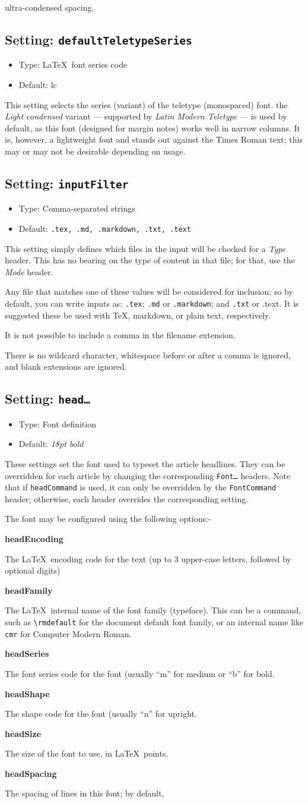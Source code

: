 \documentclass[a4paper,DIV=11]{scrartcl}
\newcommand{\deft}[2]{\nopagebreak\noindent\hspace{0.5in}\textbf{#1}\par\noindent{}#2\pagebreak[1]\par}
\newcommand{\property}[5]{
  \subsection{#1: \texttt{#2}}
  \begin{itemize}
  \item Type: #3
  \item Default: #4
  \end{itemize}
  #5
}
\newcommand{\setting}{\property{Setting}}
\begin{document}
\begin{multicols}{2}
{  ultra-condensed spacing.
}
\setting{defaultTeletypeSeries}{\LaTeX\ font series code}{lc}{
  This setting selects the series (variant) of the teletype
  (monospaced) font. the \textit{Light condensed} variant ---
  supported by \textit{Latin Modern Teletype} --- is used by default,
  as this font (designed for margin notes) works well in narrow
  columns. It is, however, a lightweight font and stands out against
  the Times Roman text; this may or may not be desirable depending on
  usage.
}
\setting{inputFilter}{Comma-separated strings}{\texttt{.tex, .md, .markdown, .txt, .text}}{
  This setting simply defines which files in the input will be checked
  for a \textit{Type} header. This has no bearing on the type of
  content in that file; for that, use the \textit{Mode} header.\par
  Any file that matches one of these values will be considered for
  inclusion; so by default, you can write inputs as: \texttt{.tex};
  \texttt{.md} or \texttt{.markdown}; and \texttt{.txt} or {.text}. It
  is suggested these be used with \TeX, markdown, or plain text, respectively.\par
  It is not possible to include a comma in the filename extension.\par
  There is no wildcard character, whitespace before or after a comma
  is ignored, and blank extensions are ignored.
}
\setting{head\dots}{Font definition}{\textit{18pt bold}}{
  These settings set the font used to typeset the article headlines. They can
  be overridden for each article by changing the corresponding
  \texttt{Font\dots} headers. Note that if \texttt{headCommand} is
  used, it can only be overridden by the \texttt{FontCommand} header;
  otherwise, each header overrides the corresponding setting.
  \par
  The font may be configured using the following options:-\par
  \deft{headEncoding}{The \LaTeX\ encoding code for the text (up to 3 upper-case
    letters, followed by optional digits)}
  \deft{headFamily}{The \LaTeX\ internal name of the font family (typeface). This
    can be a command, such as \texttt{\textbackslash rmdefault} for
    the document default font family, or an internal name like
    \texttt{cmr} for Computer Modern Roman.}
  \deft{headSeries}{The font series code for the font (usually ``m''
    for medium or ``b'' for bold.}
  \deft{headShape}{The shape code for the font (usually ``n'' for
    upright.}
  \deft{headSize}{The size of the font to use, in \LaTeX\ points.}
  \deft{headSpacing}{The spacing of lines in this font; by default,
}}
\end{multicols}
\end{document}
